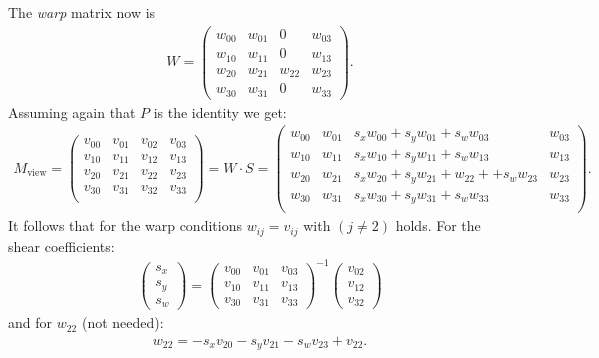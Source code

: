 The \emph{warp} matrix now is
    \begin{align*}
        W = 
            \begin{pmatrix}
                w_{00} & w_{01} & 0 & w_{03}\\
                w_{10} & w_{11} & 0 & w_{13}\\
                w_{20} & w_{21} & w_{22} & w_{23}\\
                w_{30} & w_{31} & 0 & w_{33}
            \end{pmatrix}.
    \end{align*}
Assuming again that $P$ is the identity we get:
\begin{align*}
    M_\text{view} = \begin{pmatrix}
                         v_{00} & v_{01} & v_{02} & v_{03}\\
                         v_{10} & v_{11} & v_{12} & v_{13}\\
                         v_{20} & v_{21} & v_{22} & v_{23}\\
                         v_{30} & v_{31} & v_{32} & v_{33}\\
                    \end{pmatrix} = W\cdot S = 
            \begin{pmatrix}
                w_{00} & w_{01} & s_x w_{00} + s_y w_{01} + s_w w_{03} & w_{03}\\
                w_{10} & w_{11} & s_x w_{10} + s_y w_{11} + s_w w_{13} & w_{13}\\ 
                w_{20} & w_{21} & s_x w_{20} + s_y w_{21} + w_{22} + + s_w w_{23} & w_{23}\\
                w_{30} & w_{31} & s_x w_{30} + s_y w_{31} + s_w w_{33} & w_{33}\\ 
            \end{pmatrix}.
\end{align*}
It follows that for the warp conditions $w_{ij} = v_{ij}$ with $(j\neq 2)$ holds.
For the shear coefficients:
\begin{align*}
    \begin{pmatrix}
        s_x\\
        s_y\\
        s_w
    \end{pmatrix} =
    \begin{pmatrix}
        v_{00} & v_{01} & v_{03}\\
        v_{10} & v_{11} & v_{13}\\
        v_{30} & v_{31} & v_{33}
    \end{pmatrix}^{-1}
    \begin{pmatrix}
     v_{02}\\ v_{12}\\ v_{32}
    \end{pmatrix}
\end{align*}
and for $w_{22}$ (not needed):
\begin{align*}
    w_{22} = -s_x v_{20} -s_yv_{21}-s_w v_{23} + v_{22}.
\end{align*}

